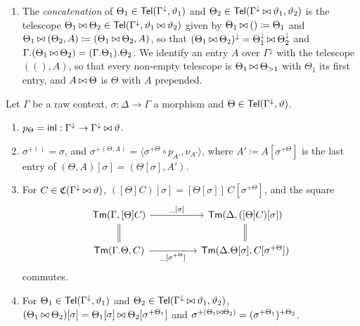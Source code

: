 \begin{definition}
\begin{enumerate}
        \item The \emph{concatenation} of $\Theta_1 \in \mathsf{Tel}(\Gamma^{\downarrow}, \vartheta_1)$ and $\Theta_2 \in \mathsf{Tel}(\Gamma^{\downarrow} \mathbin{\bowtie} \vartheta_1, \vartheta_2)$ is the telescope $\Theta_1 \mathbin{\bowtie} \Theta_2 \in \mathsf{Tel}(\Gamma^{\downarrow}, \vartheta_1 \mathbin{\bowtie} \vartheta_2)$ given by $\Theta_1 \mathbin{\bowtie} () \coloneqq \Theta_1$ and $\Theta_1 \mathbin{\bowtie} (\Theta_2, A) \coloneqq (\Theta_1 \mathbin{\bowtie} \Theta_2, A)$, so that $(\Theta_1 \mathbin{\bowtie} \Theta_2)^{\downarrow} = \Theta_1^{\downarrow} \mathbin{\bowtie} \Theta_2^{\downarrow}$ and $\Gamma.(\Theta_1 \mathbin{\bowtie} \Theta_2) = (\Gamma.\Theta_1).\Theta_2$. We identify an entry $A$ over $\Gamma^{\downarrow}$ with the telescope $((), A)$, so that every non-empty telescope is $\Theta_1 \mathbin{\bowtie} \Theta_{>1}$ with $\Theta_1$ its first entry, and $A \mathbin{\bowtie} \Theta$ is $\Theta$ with $A$ prepended.
    \end{enumerate}
\end{definition}

\begin{lemma}\label{lem:telescopes}
    Let $\Gamma$ be a raw context, $\sigma : \Delta \to \Gamma$ a morphism and $\Theta \in \mathsf{Tel}(\Gamma^{\downarrow}, \vartheta)$.
    \begin{enumerate}
        \item $p_\Theta = \mathsf{inl} : \Gamma^{\downarrow} \to \Gamma^{\downarrow} \mathbin{\bowtie} \vartheta$.
        \item $\sigma^{+()} = \sigma$, and $\sigma^{+(\Theta, A)} = \langle \sigma^{+\Theta} \circ p_{A'}, \nu_{A'} \rangle$, where $A' \coloneqq A[\sigma^{+\Theta}]$ is the last entry of $(\Theta, A)[\sigma] = (\Theta[\sigma], A')$.
        \item For $C \in \mathfrak{C}(\Gamma^{\downarrow} \mathbin{\bowtie} \vartheta)$, $([\Theta]C)[\sigma] = [\Theta[\sigma]]\, C[\sigma^{+\Theta}]$, and the square
        \[\begin{tikzcd}
            {\Tm(\Gamma, [\Theta]C)} && {\Tm(\Delta, ([\Theta]C)[\sigma])} \\
            {\Tm(\Gamma.\Theta, C)} && {\Tm(\Delta.\Theta[\sigma], C[\sigma^{+\Theta}])}
            \arrow["{\_[\sigma]}", from=1-1, to=1-3]
            \arrow[equals, from=1-1, to=2-1]
            \arrow[equals, from=1-3, to=2-3]
            \arrow["{\_[\sigma^{+\Theta}]}"', from=2-1, to=2-3]
        \end{tikzcd}\]
        commutes.
        \item For $\Theta_1 \in \mathsf{Tel}(\Gamma^{\downarrow}, \vartheta_1)$ and $\Theta_2 \in \mathsf{Tel}(\Gamma^{\downarrow} \mathbin{\bowtie} \vartheta_1, \vartheta_2)$, $(\Theta_1 \mathbin{\bowtie} \Theta_2)[\sigma] = \Theta_1[\sigma] \mathbin{\bowtie} \Theta_2[\sigma^{+\Theta_1}]$ and $\sigma^{+(\Theta_1 \mathbin{\bowtie} \Theta_2)} = (\sigma^{+\Theta_1})^{+\Theta_2}$.
    \end{enumerate}
\end{lemma}

